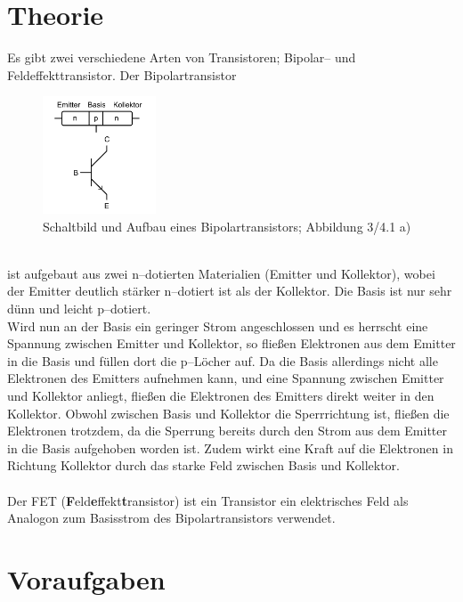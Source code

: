 \documentclass[a4paper,12pt]{article}
\numberwithin{equation}{section}
\begin{document}
\section{Theorie}
Es gibt zwei verschiedene Arten von Transistoren; Bipolar-- und Feldeffekttransistor.
Der Bipolartransistor
\begin{figure}[h]
        \centering
        \includegraphics[width=0.3\textwidth]{bipolartransistor.png}
        \caption{Schaltbild und Aufbau eines Bipolartransistors; Abbildung 3/4.1 a) \cite{Praktikumsanleitung}}
\end{figure}\\
ist aufgebaut aus zwei n--dotierten Materialien (Emitter und Kollektor), wobei der Emitter deutlich stärker n--dotiert ist als der Kollektor.
Die Basis ist nur sehr dünn und leicht p--dotiert.
\\\indent Wird nun an der Basis ein geringer Strom angeschlossen und es herrscht eine Spannung zwischen Emitter und Kollektor, so fließen Elektronen aus dem Emitter in die Basis und füllen dort die p--Löcher auf.
Da die Basis allerdings nicht alle Elektronen des Emitters aufnehmen kann, und eine Spannung zwischen Emitter und Kollektor anliegt, fließen die Elektronen des Emitters direkt weiter in den Kollektor.
Obwohl zwischen Basis und Kollektor die Sperrrichtung ist, fließen die Elektronen trotzdem, da die Sperrung bereits durch den Strom aus dem Emitter in die Basis aufgehoben worden ist.
Zudem wirkt eine Kraft auf die Elektronen in Richtung Kollektor durch das starke Feld zwischen Basis und Kollektor.
\\\\ Der FET (\textbf{F}eld\textbf{e}ffekt\textbf{t}ransistor) ist ein Transistor ein elektrisches Feld als Analogon zum Basisstrom des Bipolartransistors verwendet.

\clearpage
\section{Voraufgaben}
\end{document}
